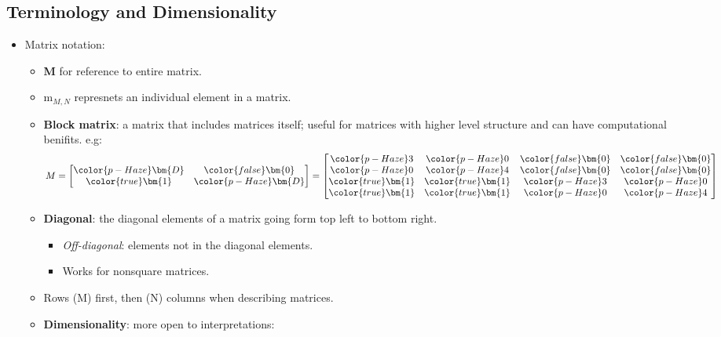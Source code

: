 \documentclass[12pt,a4paper]{article}
\begin{document}
\subsection{Terminology and Dimensionality}
\begin{itemize}
    \item Matrix notation: 
        \begin{itemize}
            \item \textbf{M} for reference to entire matrix.
            \item m\(_{M,N}\) represnets an individual element in a matrix.
            \item \textbf{Block matrix}: a matrix that includes matrices itself; useful for matrices with higher level structure and can have computational benifits. e.g:
            \begin{align*}
            M=
            \begin{bmatrix}
                {\color{p-Haze}\bm{D}} & {\color{false}\bm{0}} \\
                {\color{true}\bm{1}}  & {\color{p-Haze}\bm{D}}
            \end{bmatrix} =
            \begin{bmatrix}
                {\color{p-Haze} 3} & {\color{p-Haze} 0} & {\color{false}\bm{0}} & {\color{false}\bm{0}} \\
                {\color{p-Haze} 0} & {\color{p-Haze} 4} & {\color{false}\bm{0}} & {\color{false}\bm{0}} \\
                {\color{true}\bm{1}} & {\color{true}\bm{1}} & {\color{p-Haze} 3} & {\color{p-Haze} 0} \\
                {\color{true}\bm{1}} & {\color{true}\bm{1}} & {\color{p-Haze} 0} & {\color{p-Haze} 4} 
            \end{bmatrix}
            \end{align*}
            \item \textbf{Diagonal}: the diagonal elements of a matrix going form top left to bottom right.
                \begin{itemize}
                    \item \textit{Off-diagonal}: elements not in the diagonal elements.
                    \item Works for nonsquare matrices.
                \end{itemize}
            \item Rows (M) first, then (N) columns when describing matrices. 
            \item \textbf{Dimensionality}: more open to interpretations:

\end{itemize}
\end{itemize}
\end{document}
